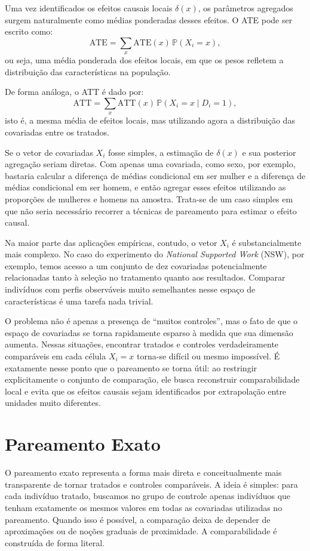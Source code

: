 Uma vez identificados os efeitos causais locais $\delta(x)$, os parâmetros agregados surgem naturalmente como médias ponderadas desses efeitos. O ATE pode ser escrito como:
\[
\text{ATE}
=
\sum_x \text{ATE}(x)\,\mathbb{P}(X_i = x),
\]
ou seja, uma média ponderada dos efeitos locais, em que os pesos refletem a distribuição das características na população.

De forma análoga, o ATT é dado por:
\[
\text{ATT}
=
\sum_x \text{ATT}(x)\,\mathbb{P}(X_i = x \mid D_i = 1),
\]
isto é, a mesma média de efeitos locais, mas utilizando agora a distribuição das covariadas entre os tratados.


Se o vetor de covariadas $X_i$ fosse simples, a estimação de $\delta(x)$ e sua posterior agregação seriam diretas. Com apenas uma covariada, como sexo, por exemplo, bastaria calcular a diferença de médias condicional em ser mulher e a diferença de médias condicional em ser homem, e então agregar esses efeitos utilizando as proporções de mulheres e homens na amostra. Trata-se de um caso simples em que não seria necessário recorrer a técnicas de pareamento para estimar o efeito causal.

Na maior parte das aplicações empíricas, contudo, o vetor $X_i$ é substancialmente mais complexo. No caso do experimento do \textit{National Supported Work} (NSW), por exemplo, temos acesso a um conjunto de dez covariadas potencialmente relacionadas tanto à seleção no tratamento quanto aos resultados. Comparar indivíduos com perfis observáveis muito semelhantes nesse espaço de características é uma tarefa nada trivial.

O problema não é apenas a presença de ``muitos controles'', mas o fato de que o espaço de covariadas se torna rapidamente esparso à medida que sua dimensão aumenta. Nessas situações, encontrar tratados e controles verdadeiramente comparáveis em cada célula $X_i = x$ torna-se difícil ou mesmo impossível. É exatamente nesse ponto que o pareamento se torna útil: ao restringir explicitamente o conjunto de comparação, ele busca reconstruir comparabilidade local e evita que os efeitos causais sejam identificados por extrapolação entre unidades muito diferentes.


\section{Pareamento Exato}

O pareamento exato representa a forma mais direta e conceitualmente mais transparente de tornar tratados e controles comparáveis. A ideia é simples: para cada indivíduo tratado, buscamos no grupo de controle apenas indivíduos que tenham exatamente os mesmos valores em todas as covariadas utilizadas no pareamento. Quando isso é possível, a comparação deixa de depender de aproximações ou de noções graduais de proximidade. A comparabilidade é construída de forma literal.

